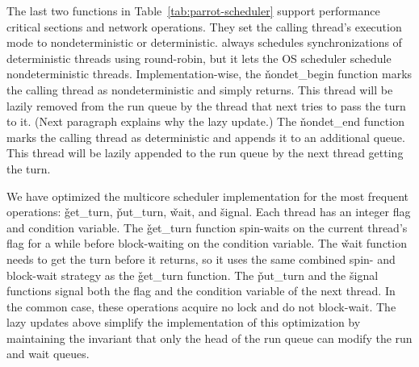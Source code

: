 The last two functions in Table~\ref{tab:parrot-scheduler} support performance
critical sections and network operations.  They set the calling thread's
execution mode to nondeterministic or deterministic. \parrot always schedules
synchronizations of deterministic threads using round-robin, but it lets
the OS scheduler schedule nondeterministic threads.
Implementation-wise, the \v{nondet\_begin} function marks the calling
thread as nondeterministic and simply returns.  This thread will be lazily
removed from the run queue by the thread that next tries to pass the turn to it.
(Next paragraph explains why the lazy update.)
The \v{nondet\_end} function marks the calling thread as deterministic and
appends it to an additional queue.  This thread will be lazily appended to
the run queue by the next thread getting the turn.

We have optimized the multicore scheduler implementation for the most frequent
operations: \v{get\_turn}, \v{put\_turn}, \v{wait}, and \v{signal}.  Each
thread has an integer flag and condition variable. The \v{get\_turn} function
spin-waits on the current thread's flag for a while before block-waiting
on the condition variable. The \v{wait} function needs to get the turn before it
returns, so it uses the same combined spin- and block-wait strategy as
the \v{get\_turn} function. The \v{put\_turn} and the 
\v{signal} functions signal both the flag and the
condition variable of the next thread.  In the common case, these
operations acquire no lock and do not block-wait.  The lazy updates above
simplify the implementation of this optimization by maintaining the
invariant that only the head of the run queue can modify the run and wait
queues.



